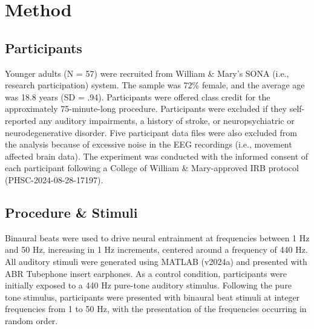 \section{Method}
\subsection{Participants}
\par Younger adults (N = 57) were recruited from William \& Mary’s SONA (i.e., research participation) system. The sample was 72\% female, and the average age was 18.8 years (SD = .94). Participants were offered class credit for the approximately 75-minute-long procedure. Participants were excluded if they self-reported any auditory impairments, a history of stroke, or neuropsychiatric or neurodegenerative disorder. Five participant data files were also excluded from the analysis because of excessive noise in the EEG recordings (i.e., movement affected brain data). The experiment was conducted with the informed consent of each participant following a College of William \& Mary-approved IRB protocol (PHSC-2024-08-28-17197). 
\subsection{Procedure \& Stimuli }
Binaural beats were used to drive neural entrainment at frequencies between 1 Hz and 50 Hz, increasing in 1 Hz increments, centered around a frequency of 440 Hz. All auditory stimuli were generated using MATLAB (v2024a) and presented with ABR Tubephone insert earphones. As a control condition, participants were initially exposed to a 440 Hz pure-tone auditory stimulus. Following the pure tone stimulus, participants were presented with binaural beat stimuli at integer frequencies from 1 to 50 Hz, with the presentation of the frequencies occurring in random order. 